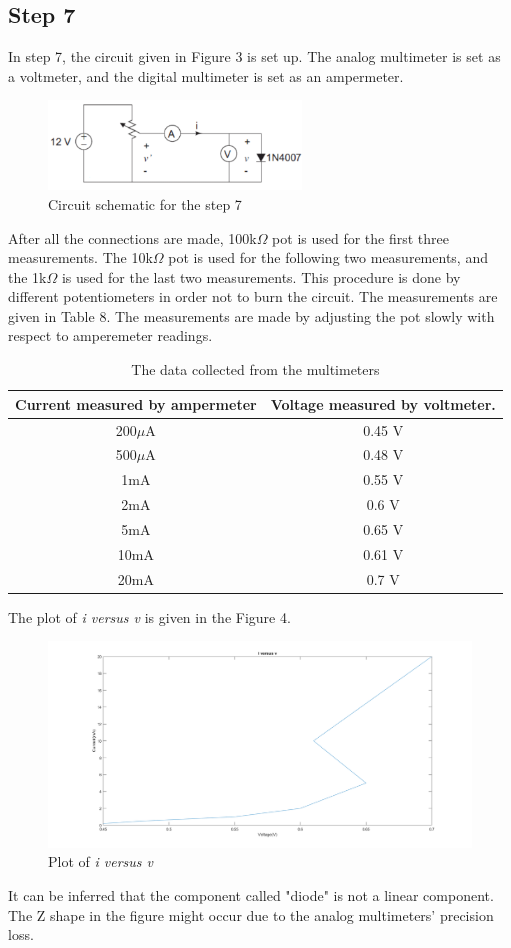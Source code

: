 \documentclass[letterpaper,12pt]{article}
\begin{document}
\subsection{Step 7}
In step 7, the circuit given in Figure 3 is set up. The analog multimeter is set as a voltmeter, and the digital multimeter is set as an ampermeter.  
\begin{figure}[H]
	\caption{Circuit schematic for the step 7}
	\centering
	\includegraphics[width=0.6\textwidth]{7.png}
\end{figure} 
After all the connections are made, 100k\(\Omega\) pot is used for the first three measurements. The 10k\(\Omega\) pot is used for the following two measurements, and the 1k\(\Omega\) is used for the last two measurements. This procedure is done by different potentiometers in order not to burn the circuit. The measurements are given in Table 8. The measurements are made by adjusting the pot slowly with respect to amperemeter readings.
\begin{table}[H]
	\centering
	\begin{tabular}{|| c | c ||}
		\hline
	Current measured by ampermeter & Voltage measured by voltmeter. \\\hline
	\hline
	200\( \mu \)A & 0.45 V \\\hline
	500\( \mu \)A & 0.48 V \\\hline
	1mA & 0.55 V \\\hline
	2mA & 0.6 V \\\hline
	5mA & 0.65 V \\\hline
	10mA & 0.61 V\\\hline
	20mA & 0.7 V \\\hline
	\end{tabular}
	\caption{The data  collected from the  multimeters}
\end{table}
The plot of \emph{i versus v} is given in the Figure 4.
\begin{figure}[H]
	\caption{Plot of \emph{i versus v}}
	\centering
	\includegraphics[width=1\textwidth]{7fig.png}
\end{figure} 
It can be inferred that the component called "diode" is not a linear component. The Z shape in the figure might occur due to the analog multimeters' precision loss. 
\end{document}
